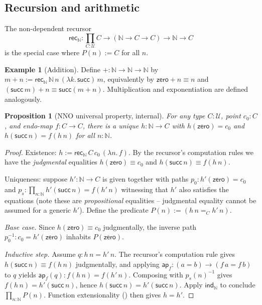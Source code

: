 \documentclass[12pt]{article}
\newtheorem{proposition}[theorem]{Proposition}
\theoremstyle{definition}
\newtheorem{example}[theorem]{Example}
\theoremstyle{remark}
\newcommand{\U}{\mathcal{U}}
\newcommand{\N}{\mathbb{N}}
\newcommand{\zero}{\mathsf{zero}}
\newcommand{\suc}{\mathsf{succ}}
\begin{document}
\subsection{Recursion and arithmetic}

The non-dependent recursor
\[
\mathsf{rec}_\N : \prod_{C : \U} C \to (\N \to C \to C) \to \N \to C
\]
is the special case where $P(n) := C$ for all $n$.

\begin{example}[Addition]
\label{ex:add}
Define $+ : \N \to \N \to \N$ by
$m + n := \mathsf{rec}_\N\,\N\,n\,(\lambda k.\,\suc)\,m$, equivalently by
$\zero + n \equiv n$ and $(\suc\,m) + n \equiv \suc(m + n)$. Multiplication
and exponentiation are defined analogously.
\end{example}

\begin{proposition}[NNO universal property, internal]
\label{prop:nno}
For any type $C : \U$, point $c_0 : C$, and endo-map $f : C \to C$, there is
a unique $h : \N \to C$ with $h(\zero) = c_0$ and
$h(\suc\,n) = f(h\,n)$ for all $n : \N$.
\end{proposition}

\begin{proof}
Existence: $h := \mathsf{rec}_\N\,C\,c_0\,(\lambda n.\,f)$. By the
recursor's computation rules we have the \emph{judgmental} equalities
$h(\zero) \equiv c_0$ and $h(\suc\,n) \equiv f(h\,n)$.

Uniqueness: suppose $h' : \N \to C$ is given together with paths
$p_0 : h'(\zero) = c_0$ and
$p_s : \prod_{n : \N} h'(\suc\,n) = f(h'\,n)$
witnessing that $h'$ also satisfies the equations (note these are
\emph{propositional} equalities -- judgmental equality cannot be assumed
for a generic $h'$). Define the predicate
$P(n) := (h\,n =_C h'\,n)$.

\emph{Base case.} Since $h(\zero) \equiv c_0$ judgmentally, the
inverse path $p_0^{-1} : c_0 = h'(\zero)$ inhabits $P(\zero)$.

\emph{Inductive step.} Assume $q : h\,n = h'\,n$. The recursor's
computation rule gives $h(\suc\,n) \equiv f(h\,n)$ judgmentally, and
applying $\mathsf{ap}_f : (a = b) \to (f\,a = f\,b)$ to $q$ yields
$\mathsf{ap}_f(q) : f(h\,n) = f(h'\,n)$. Composing with $p_s(n)^{-1}$
gives $f(h\,n) = h'(\suc\,n)$, hence $h(\suc\,n) = h'(\suc\,n)$.
Apply $\mathsf{ind}_\N$ to conclude $\prod_{n : \N} P(n)$. Function
extensionality () then gives $h = h'$.
\end{proof}
\end{document}
